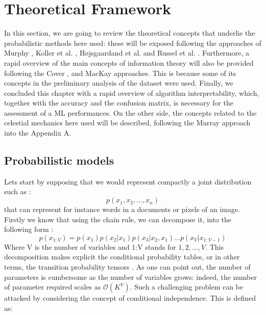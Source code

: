 \documentclass[12pt,%
               a4paper,%
               oneside,openany,%
               titlepage,%
               headinclude,footinclude,%
               BCOR5mm,%
               cleardoublepage=empty,%
               tablecaptionabove,%
               floatperchapter,
               ]{scrreprt}                 %
\begin{document}
 


\chapter{Theoretical Framework}

In this section, we are going to review the theoretical concepts
that underlie the probabilistic methods here used: these will be
exposed following the approaches of Murphy \cite{murphy2012machine} , Koller
et al. \citep{koller2009probabilistic}, Højsgaardand et al. \citep{hojsgaard2012graphical} and Russel et al. \citep{russell2010artificial}. Furthermore, a rapid overview of the main concepts of information theory will also be provided following the Cover \citep{cover2006elements}, and MacKay \citep{mackay2003information} approaches. This is because some of its concepts in the preliminary analysis of the dataset were used. Finally, we concluded this chapter with a rapid overview of algorithm interpretability, which, together with the accuracy and the
confusion matrix, is necessary for the assessment of a ML performances. On the other side, the concepts related to the celestial
mechanics here used will be described, following the Murray
approach \cite{murray1999solar} into the Appendix A.

\section{Probabilistic models}

Lets start by supposing that we would represent compactly a joint distribution such as \cite{murphy2012machine}:
\begin{equation}
p(x_{1},x_{2},...,x_{n})
\end{equation}
that can represent for instance words in a documents or pixels of an image.  Firstly we know that using the chain rule,  we can decompose it, into the following form \cite{murphy2012machine}:
\begin{equation}
p(x_{1:V})=p(x_{1})p(x_{2}|x_{1})p(x_{3}|x_{2},x_{1})...p(x_{V}|x_{1:V-1})
\end{equation}
Where V is the number of variables and 1:V stands for ${1,2,...,V}$.  This decomposition makes explicit the conditional probability tables, or in other terms, the transition probability tensors \cite{wu2017markov}.  As one can point out, the number of parameters is cumbersome as the number of variables grows: indeed, the number of parameter required scales as $\mathcal{O}(K^{V})$.  Such a challenging problem can be attacked by considering the concept of conditional independence. This is defined as\cite{murphy2012machine}:
\end{document}
